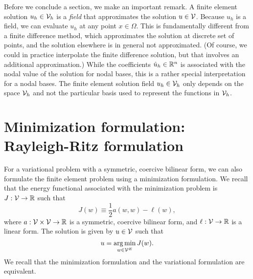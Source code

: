 Before we conclude a section, we make an important remark.  A finite element solution $u_h \in \mathcal{V}_h$ is a \emph{field} that approximates the solution $u \in \mathcal{V}$. Because $u_h$ is a field, we can evaluate $u_h$ at any point $x \in \Omega$.  This is fundamentally different from a finite difference method, which approximates the solution at discrete set of points, and the solution elsewhere is in general not approximated.  (Of course, we could in practice interpolate the finite difference solution, but that involves an additional approximation.)  While the coefficients $\hat u_h \in \mathbb{R}^n$ is associated with the nodal value of the solution for nodal bases, this is a rather special interpretation for a nodal bases. The finite element solution field $u_h \in \mathcal{V}_h$ only depends on the space $\mathcal{V}_h$ and not the particular basis used to represent the functions in $\mathcal{V}_h$. %



\section{Minimization formulation: Rayleigh-Ritz formulation}
For a variational problem with a symmetric, coercive bilinear form, we can also formulate the finite element problem using a minimization formulation.  We recall that the energy functional associated with the minimization problem is $J: \mathcal{V} \to \mathbb{R}$ such that
\begin{equation*}
  J(w) \equiv \frac{1}{2} a(w,w) - \ell(w),
\end{equation*}
where $a: \mathcal{V} \times \mathcal{V} \to \mathbb{R}$ is a symmetric, coercive bilinear form, and $\ell: \mathcal{V} \to \mathbb{R}$ is a linear form.  The solution is given by $u \in \mathcal{V}$ such that
\begin{equation*}
  u = \operatorname*{arg\,min}_{w \in \mathcal{V}^E} J(w).
\end{equation*}
We recall that the minimization formulation and the variational formulation are equivalent.

